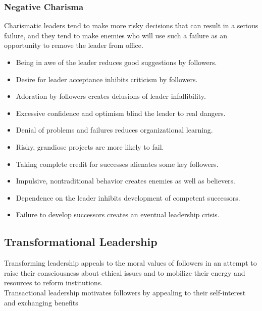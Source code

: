 
\subsubsection{Negative Charisma} %
\label{ssub:negative_charisma}
	Charismatic leaders tend to make more risky decisions that can result in a serious failure, and they tend to make enemies who will use such a failure as an opportunity to remove the leader from office.

	\begin{itemize}
		\item Being in awe of the leader reduces good suggestions by followers.
		\item Desire for leader acceptance inhibits criticism by followers.
		\item Adoration by followers creates delusions of leader infallibility.
		\item Excessive confidence and optimism blind the leader to real dangers.
		\item Denial of problems and failures reduces organizational learning.
		\item Risky, grandiose projects are more likely to fail.
		\item Taking complete credit for successes alienates some key followers.
		\item Impulsive, nontraditional behavior creates enemies as well as believers.
		\item Dependence on the leader inhibits development of competent successors.
		\item Failure to develop successors creates an eventual leadership crisis.
	\end{itemize}


\subsection{Transformational Leadership} %
\label{sub:transformational_leadership}
	Transforming leadership appeals to the moral values of followers in an attempt to raise their consciousness about ethical issues and to mobilize their energy and resources to reform institutions. 
	\\Transactional leadership motivates followers by appealing to their self‐interest and exchanging benefits

